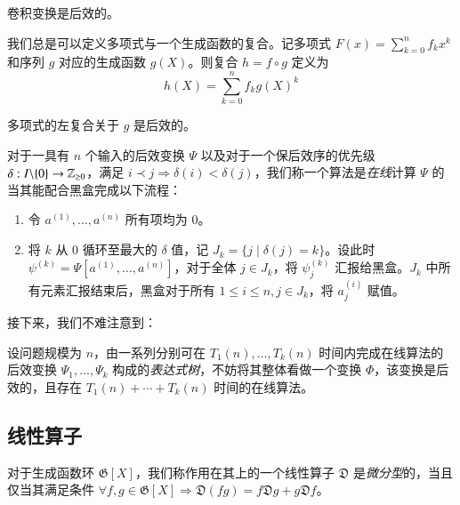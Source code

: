 \begin{lemma}
卷积变换是后效的。
\end{lemma}

\begin{definition} [多项式左复合]
我们总是可以定义多项式与一个生成函数的复合。记多项式 $F(x) = \sum_{k=0}^n f_k x^k$ 和序列 $g$ 对应的生成函数 $g(X)$。则复合 $h = f \circ g$ 定义为
$$
h(X) = \sum_{k=0}^n f_k g(X)^k
$$
\end{definition}

\begin{lemma}
多项式的左复合关于 $g$ 是后效的。
\end{lemma}

\begin{definition} [在线算法] \label{relaxedalgo}
对于一具有 $n$ 个输入的后效变换 $\Psi$ 以及对于一个保后效序的优先级 $\delta: {I \backslash \{0\}} \rightarrow \mathbb Z_{\ge 0}$，满足 $i \prec j \Rightarrow \delta(i) < \delta(j)$，我们称一个算法是\emph{在线}计算 $\Psi$ 的当其能配合黑盒完成以下流程：
\begin{enumerate}
\item 令 $a^{(1)}, \dots, a^{(n)}$ 所有项均为 $0$。

\item 将 $k$ 从 $0$ 循环至最大的 $\delta$ 值，记 $J_k = \{ j \mid \delta(j) = k \}$。设此时 $\psi^{(k)} = \Psi[a^{(1)}, \dots, a^{(n)}]$，对于全体 $j\in J_k$，将 $\psi^{(k)}_j$ 汇报给黑盒。$J_k$ 中所有元素汇报结束后，黑盒对于所有 $1\le i\le n, j\in J_k$，将 $a^{(i)}_j$ 赋值。
\end{enumerate}
\end{definition}

接下来，我们不难注意到：

\begin{lemma}
设问题规模为 $n$，由一系列分别可在 $T_1(n),\dots,T_k(n)$ 时间内完成在线算法的后效变换 $\Psi_1,\dots, \Psi_k$ 构成的\emph{表达式树}，不妨将其整体看做一个变换 $\Phi$，该变换是后效的，且存在 $T_1(n) + \cdots + T_k(n)$ 时间的在线算法。
\end{lemma}

\subsection{线性算子}

\begin{definition}[微分型算子]
对于生成函数环 $\mathfrak G[X]$，我们称作用在其上的一个线性算子 $\mathfrak D$ 是\emph{微分型}的，当且仅当其满足条件 $\forall f,g\in \mathfrak G[X] \Rightarrow \mathfrak D(fg) = f\mathfrak D g+g\mathfrak D f$。
\end{definition}

